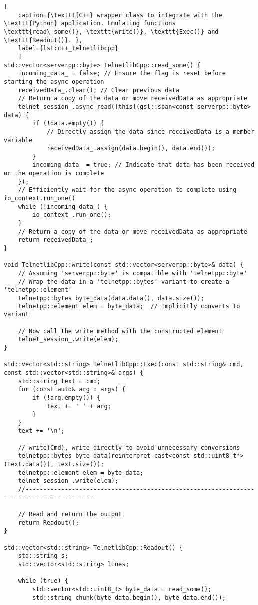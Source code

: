 \begin{lstlisting}[
	caption={\texttt{C++} wrapper class to integrate with the \texttt{Python} application. Emulating functions \texttt{read\_some()}, \texttt{write()}, \texttt{Exec()} and \texttt{Readout()}. },
	label={lst:c++_telnetlibcpp}
	]
std::vector<serverpp::byte> TelnetlibCpp::read_some() {
	incoming_data_ = false; // Ensure the flag is reset before starting the async operation
	receivedData_.clear(); // Clear previous data
	// Return a copy of the data or move receivedData as appropriate
	telnet_session_.async_read([this](gsl::span<const serverpp::byte> data) {
		if (!data.empty()) {
			// Directly assign the data since receivedData is a member variable
			receivedData_.assign(data.begin(), data.end());
		}
		incoming_data_ = true; // Indicate that data has been received or the operation is complete
	});
	// Efficiently wait for the async operation to complete using io_context.run_one()
	while (!incoming_data_) {
		io_context_.run_one();
	}
	// Return a copy of the data or move receivedData as appropriate
	return receivedData_;
}

void TelnetlibCpp::write(const std::vector<serverpp::byte>& data) {
	// Assuming 'serverpp::byte' is compatible with 'telnetpp::byte'
	// Wrap the data in a 'telnetpp::bytes' variant to create a 'telnetpp::element'
	telnetpp::bytes byte_data(data.data(), data.size());
	telnetpp::element elem = byte_data;  // Implicitly converts to variant
	
	// Now call the write method with the constructed element
	telnet_session_.write(elem);
}

std::vector<std::string> TelnetlibCpp::Exec(const std::string& cmd, const std::vector<std::string>& args) {
	std::string text = cmd;
	for (const auto& arg : args) {
		if (!arg.empty()) {
			text += ' ' + arg;
		}
	}
	text += '\n';
	
	// write(Cmd), write directly to avoid unnecessary conversions 
	telnetpp::bytes byte_data(reinterpret_cast<const std::uint8_t*>(text.data()), text.size());
	telnetpp::element elem = byte_data;
	telnet_session_.write(elem); 
	//-----------------------------------------------------------------------------------------
	
	// Read and return the output
	return Readout();
}

std::vector<std::string> TelnetlibCpp::Readout() {
	std::string s;
	std::vector<std::string> lines;
	
	while (true) {
		std::vector<std::uint8_t> byte_data = read_some();
		std::string chunk(byte_data.begin(), byte_data.end());
		

\end{lstlisting}
